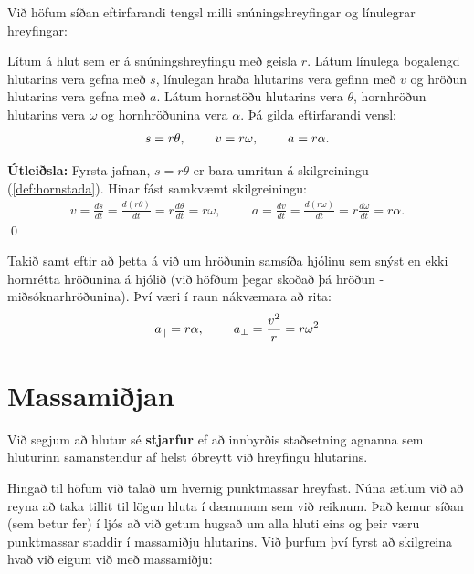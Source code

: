 Við höfum síðan eftirfarandi tengsl milli snúningshreyfingar og línulegrar hreyfingar:

\begin{tcolorbox}
\begin{theorem}
Lítum á hlut sem er á snúningshreyfingu með geisla $r$. Látum línulega bogalengd hlutarins vera gefna með $s$, línulegan hraða hlutarins vera gefinn með $v$ og hröðun hlutarins vera gefna með $a$. Látum hornstöðu hlutarins vera $\theta$, hornhröðun hlutarins vera $\omega$ og hornhröðunina vera $\alpha$. Þá gilda eftirfarandi vensl:
\begin{align*}
    s = r\theta, \hspace{0.8cm} v = r\omega, \hspace{0.8cm} a = r\alpha.
\end{align*}
\end{theorem}
\end{tcolorbox}
\textbf{Útleiðsla:} Fyrsta jafnan, $s = r\theta$ er bara umritun á skilgreiningu (\ref{def:hornstada}). Hinar fást samkvæmt skilgreiningu: 
\begin{align*}
    v = \frac{ds}{dt} = \frac{d(r\theta)}{dt} = r \frac{d\theta}{dt} = r\omega, \hspace{1cm} a = \frac{dv}{dt} = \frac{d(r\omega)}{dt} = r \frac{d\omega}{dt} = r\alpha.
\end{align*}
\qed

Takið samt eftir að þetta á við um hröðunin samsíða hjólinu sem snýst en ekki hornrétta hröðunina á hjólið (við höfðum þegar skoðað þá hröðun - miðsóknarhröðunina). Því væri í raun nákvæmara að rita:
\begin{align*}
    a_{\parallel} = r\alpha, \hspace{0.8cm} a_{\perp} = \frac{v^2}{r} = r\omega^2
\end{align*}

\section{Massamiðjan}


\begin{tcolorbox}
\begin{definition}
Við segjum að hlutur sé \textbf{stjarfur} ef að innbyrðis staðsetning agnanna sem hluturinn samanstendur af helst óbreytt við hreyfingu hlutarins.
\end{definition}
\end{tcolorbox}

Hingað til höfum við talað um hvernig punktmassar hreyfast. Núna ætlum við að reyna að taka tillit til lögun hluta í dæmunum sem við reiknum. Það kemur síðan (sem betur fer) í ljós að við getum hugsað um alla hluti eins og þeir væru punktmassar staddir í massamiðju hlutarins. Við þurfum því fyrst að skilgreina hvað við eigum við með massamiðju:

